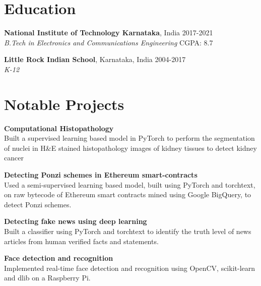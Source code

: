 \documentclass[margin]{res}
\begin{document}
  \address{National Institute of Technology\\
           Karnataka, India\\
           russel.171ec143@nitk.edu.in}
  \address{{\faMobile} (91+) 9611212081\\
           {\faLinkedin} \href{https://linkedin.com/in/rshwndsz}{linkedin.com/in/rshwndsz}\\
           {\faGithub} \href{https://github.com/rshwndsz}{github.com/rshwndsz}}


  \begin{resume}
    \section{Education}
      \textbf{National Institute of Technology Karnataka}, India\hfill
      2017-2021 \\
      {\sl B.Tech in Electronics and Communications Engineering}
      \hfill{CGPA: 8.7}

      \textbf{Little Rock Indian School}, Karnataka, India\hfill
      2004-2017 \\
      {\sl K-12}


    \section{Notable Projects}
      \par
      \textbf{Computational Histopathology}\\
      Built a supervised learning based model in PyTorch to perform the segmentation of nuclei in H\&E stained histopathology images of kidney tissues to detect kidney cancer

      \par
      \textbf{Detecting Ponzi schemes in Ethereum smart-contracts}\\
      Used a semi-supervised learning based model, built using PyTorch and torchtext, on raw bytecode of Ethereum smart contracts mined using Google BigQuery, to detect Ponzi schemes.

      \par
      \textbf{Detecting fake news using deep learning}\\
      Built a classifier using PyTorch and torchtext to identify the truth level of news articles from human verified facts and statements.

      \par
      \textbf{Face detection and recognition}\\
      Implemented real-time face detection and recognition using OpenCV, scikit-learn and dlib on a Raspberry Pi.



\end{resume}
\end{document}
